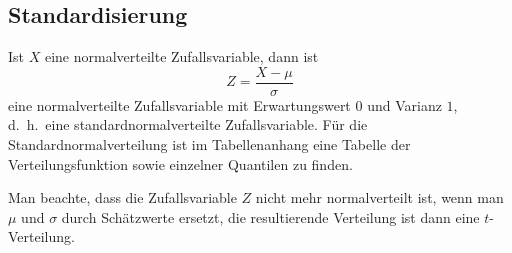 \subsection{Standardisierung}
Ist $X$ eine normalverteilte Zufallsvariable, dann ist 
\[
Z=\frac{X-\mu}{\sigma}
\]
eine normalverteilte Zufallsvariable mit Erwartungswert $0$ und Varianz $1$,
d.~h.~eine standardnormalverteilte Zufallsvariable.
Für die Standardnormalverteilung ist im Tabellenanhang eine Tabelle der
Verteilungsfunktion sowie einzelner Quantilen zu finden.

Man beachte, dass die Zufallsvariable $Z$ nicht mehr normalverteilt ist, wenn man
$\mu$ und $\sigma$ durch Schätzwerte ersetzt, die resultierende Verteilung
ist dann eine $t$-Verteilung.
